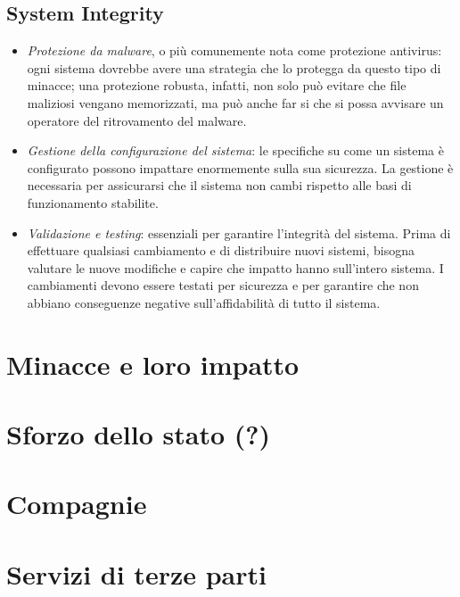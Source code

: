 \subsection{System Integrity}
\begin{itemize}
\item \textit{Protezione da malware}, o più comunemente nota come protezione antivirus: ogni sistema dovrebbe avere una strategia che lo protegga da questo tipo di minacce; una protezione robusta, infatti, non solo può evitare che file maliziosi vengano memorizzati, ma può anche far si che si possa avvisare un operatore del ritrovamento del malware. 
\item \textit{Gestione della configurazione del sistema}: le specifiche su come un sistema è configurato possono impattare enormemente sulla sua sicurezza. La gestione è necessaria per assicurarsi che il sistema non cambi rispetto alle basi di funzionamento stabilite.
\item \textit{Validazione e testing}: essenziali per garantire l'integrità del sistema. Prima di effettuare qualsiasi cambiamento e di distribuire nuovi sistemi, bisogna valutare le nuove modifiche e capire che impatto hanno sull'intero sistema. I cambiamenti devono essere testati per sicurezza e per garantire che non abbiano conseguenze negative sull'affidabilità di tutto il sistema.
\end{itemize}

\section{Minacce e loro impatto}

\section{Sforzo dello stato (?)}

\section{Compagnie}

\section{Servizi di terze parti}

